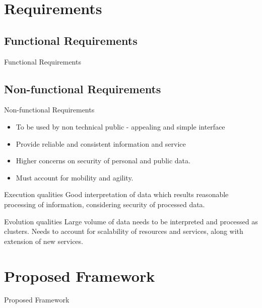 \documentclass{beamer}
\begin{document}

\section{Requirements}
\subsection{Functional Requirements}
\begin{frame}{Functional Requirements}
\end{frame}

\subsection{Non-functional Requirements}
\begin{frame}{Non-functional Requirements}
    \begin{itemize}
        \item To be used by non technical public - appealing and simple interface
        \item Provide reliable and consistent information and service
        \item Higher concerns on security of personal and public data.
        \item Must account for mobility and agility.
    \end{itemize}
    
    \begin{block}{Execution qualities}
        Good interpretation of data which results reasonable processing of information, considering security of processed data.
    \end{block}

    \begin{block}{Evolution qualities}
        Large volume of data needs to be interpreted and processed as clusters. Needs to account for scalability of resources and services, along with extension of new services.
    \end{block}
\end{frame}


\section{Proposed Framework}
\begin{frame}{Proposed Framework}
\end{frame}
\end{document}
